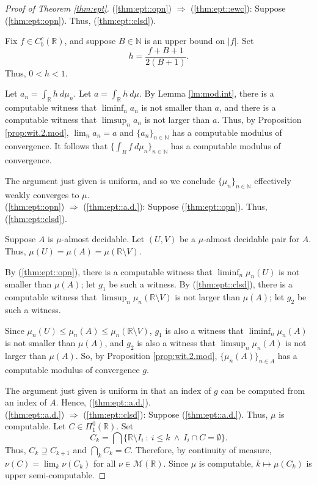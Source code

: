 \documentclass{amsart}
\newcommand{\R}{\mathbb{R}}
\newcommand{\N}{\mathbb{N}}
\newcommand{\M}{\mathcal{M}}
\newcommand{\ol}{\overline}
\theoremstyle{definition}
\numberwithin{equation}{section}
\begin{document}
\begin{proof}[Proof of Theorem \ref{thm:ept}]
(\ref{thm:ept::opn}) $\Rightarrow$ (\ref{thm:ept::ewc}): Suppose (\ref{thm:ept::opn}).  
Thus, (\ref{thm:ept::clsd}).   

Fix $f \in C^c_b(\R)$, and suppose $B \in \N$ is an upper bound on $|f|$.  Set 
\[
h = \frac{f + B + 1}{2(B+1)}.
\]
Thus, $0 < h < 1$.  

Let $a_n = \int_\R h\ d\mu_n$.  
Let $a = \int_\R h\ d\mu$.  
By Lemma \ref{lm:mod.int}, there is a computable witness that 
$\liminf_n a_n$ is not smaller than $a$, and there is a computable witness that 
$\limsup_n a_n$ is not larger than $a$.  Thus, by Proposition \ref{prop:wit.2.mod}, $\lim_n a_n = a$ and 
$\{a_n\}_{n \in \N}$ has a computable modulus of convergence.  It follows that 
$\{\int_R f\ d\mu_n\}_{n \in \N}$ has a computable modulus of convergence.

The argument just given is uniform, and so we conclude $\{\mu_n\}_{n \in \N}$ effectively weakly converges to $\mu$.\\ 

(\ref{thm:ept::opn}) $\Rightarrow$ (\ref{thm:ept::a.d.}): Suppose (\ref{thm:ept::opn}).   Thus, (\ref{thm:ept::clsd}). 

Suppose $A$ is $\mu$-almost decidable.  Let $(U,V)$ be a $\mu$-almost decidable pair for $A$.  
Thus, $\mu(U) = \mu(A) = \mu(\R \setminus V)$.  

By (\ref{thm:ept::opn}), there is a computable witness that $\liminf_n \mu_n(U)$ is not smaller than $\mu(A)$; let $g_1$ be such a witness.  By (\ref{thm:ept::clsd}), there is a computable witness that $\limsup_n \mu_n(\R \setminus V)$ is not larger than $\mu(A)$; let $g_2$ be such a witness.

Since $\mu_n(U) \leq \mu_n(A) \leq \mu_n(\R \setminus V)$, $g_1$ is also a witness that $\liminf_n \mu_n(A)$ is not smaller than $\mu(A)$, and $g_2$ is also a witness that $\limsup_n \mu_n(A)$ is not larger than $\mu(A)$.  
So, by Proposition \ref{prop:wit.2.mod}, $\{\mu_n(A)\}_{n \in A}$ has a computable modulus of convergence $g$.   

The argument just given is uniform in that an index of $g$ can be computed from an index of $A$.  Hence, (\ref{thm:ept::a.d.}). \\

(\ref{thm:ept::a.d.}) $\Rightarrow$ (\ref{thm:ept::clsd}): Suppose (\ref{thm:ept::a.d.}).  Thus, $\mu$ is computable.  
Let $C \in \Pi^0_1(\R)$.  Set
\[
C_k = \bigcap \{\R \setminus I_i\ :\ i \leq k\ \wedge\ I_i \cap C = \emptyset\}.
\]
Thus, $C_k \supseteq C_{k+1}$ and $\bigcap_k C_k = C$.  Therefore, by continuity of measure, 
$\nu(C) = \lim_k \nu(C_k)$ for all $\nu \in \M(\R)$. 
Since $\mu$ is computable, $k \mapsto \mu(C_k)$ is upper semi-computable.  


\end{proof}
\end{document}
